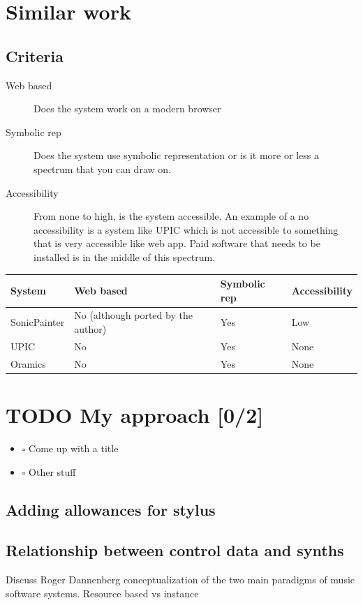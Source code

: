 \documentclass[a4paper,12pt]{article}
\begin{document}
\section{Similar work}
\label{sec:org4c762d3}
\subsection{Criteria}
\label{sec:org47c5792}
\begin{description}
\item[{Web based}] Does the system work on a modern browser
\item[{Symbolic rep}] Does the system use symbolic representation or is it more or
less a spectrum that you can draw on.
\item[{Accessibility}] From none to high, is the system accessible. An example of a
no accessibility is a system like UPIC which is not
accessible to something that is very accessible like web
app. Paid software that needs to be installed is in the
middle of this spectrum.
\end{description}

\begin{center}
\begin{tabular}{llll}
System & Web based & Symbolic rep & Accessibility\\
\hline
SonicPainter & No (although ported by the author) & Yes & Low\\
UPIC & No & Yes & None\\
Oramics & No & Yes & None\\
\end{tabular}
\end{center}

\section{{\bfseries\sffamily TODO} My approach [0/2]}
\label{sec:orgb479b30}
\begin{itemize}
\item $\square$ Come up with a title
\item $\square$ Other stuff
\end{itemize}

\subsection{Adding allowances for stylus}
\label{sec:org8f07cb7}
\subsection{Relationship between control data and synths}
\label{sec:org7a52243}
Discuss Roger Dannenberg conceptualization of the two main paradigms of music
software systems. Resource based vs instance \cite{dannenberg_resource-instance_1991} 
\end{document}
